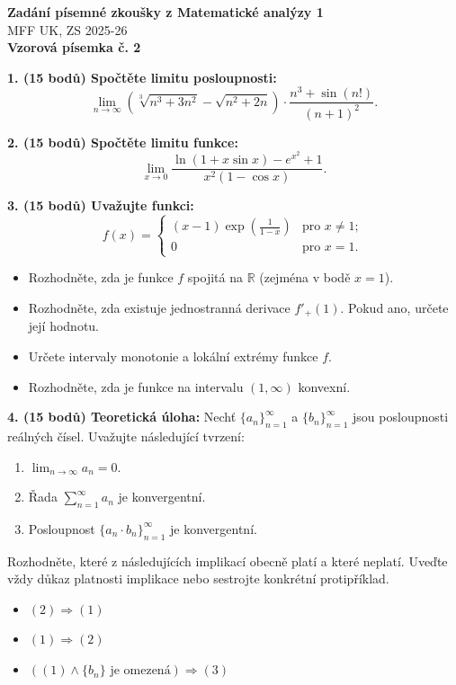 \documentclass[a4paper,12pt]{article}
\begin{document}
\noindent
\textbf{Zadání písemné zkoušky z Matematické analýzy 1} \\
MFF UK, ZS 2025-26 \\
\textbf{Vzorová písemka č. 2}

\vspace{1cm}

\noindent
\textbf{1. (15 bodů) Spočtěte limitu posloupnosti:}
$$ \lim_{n\rightarrow\infty} \left( \sqrt[3]{n^3+3n^2} - \sqrt{n^2+2n} \right) \cdot \frac{n^3 + \sin(n!)}{(n+1)^2}. $$

\vspace{0.5cm}

\noindent
\textbf{2. (15 bodů) Spočtěte limitu funkce:}
$$ \lim_{x\rightarrow 0} \frac{\ln(1 + x\sin x) - e^{x^2} + 1}{x^2(1 - \cos x)}. $$

\vspace{0.5cm}

\noindent
\textbf{3. (15 bodů) Uvažujte funkci:}
$$ f(x) = \begin{cases} 
(x-1)\exp\left(\frac{1}{1-x}\right) & \text{pro } x \neq 1; \\
0 & \text{pro } x = 1.
\end{cases} $$
\begin{itemize}
    \item[(a)] Rozhodněte, zda je funkce $f$ spojitá na $\mathbb{R}$ (zejména v bodě $x=1$).
    \item[(b)] Rozhodněte, zda existuje jednostranná derivace $f'_{+}(1)$. Pokud ano, určete její hodnotu.
    \item[(c)] Určete intervaly monotonie a lokální extrémy funkce $f$.
    \item[(d)] Rozhodněte, zda je funkce na intervalu $(1, \infty)$ konvexní.
\end{itemize}

\vspace{0.5cm}

\noindent
\textbf{4. (15 bodů) Teoretická úloha:}
Nechť $\{a_n\}_{n=1}^{\infty}$ a $\{b_n\}_{n=1}^{\infty}$ jsou posloupnosti reálných čísel. Uvažujte následující tvrzení:
\begin{enumerate}
    \item[(1)] $\lim_{n\to\infty} a_n = 0$.
    \item[(2)] Řada $\sum_{n=1}^{\infty} a_n$ je konvergentní.
    \item[(3)] Posloupnost $\{a_n \cdot b_n\}_{n=1}^{\infty}$ je konvergentní.
\end{enumerate}

\noindent
Rozhodněte, které z následujících implikací obecně platí a které neplatí. Uveďte vždy důkaz platnosti implikace nebo sestrojte konkrétní protipříklad.
\begin{itemize}
    \item[(a)] $(2) \Rightarrow (1)$
    \item[(b)] $(1) \Rightarrow (2)$
    \item[(c)] $\left( (1) \wedge \{b_n\} \text{ je omezená} \right) \Rightarrow (3)$
\end{itemize}
\end{document}
